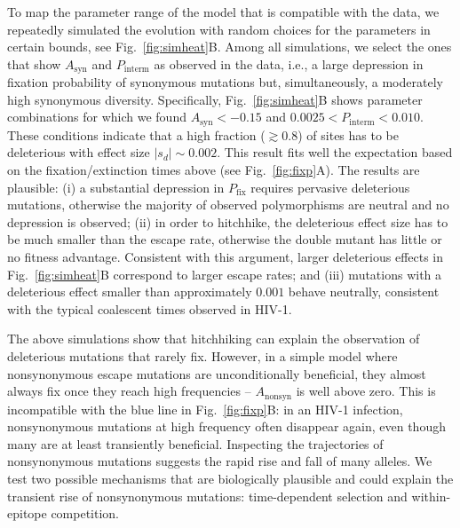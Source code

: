 \documentclass[10pt]{article}
\newcommand{\pfix}{P_{\mathrm{fix}}}
\newcommand{\FIG}[1]{Fig.~\ref{fig:#1}}
\begin{document}
To map the parameter range of the model that is compatible with the data, we
repeatedly simulated the evolution with random choices for the parameters in
certain bounds, see \FIG{simheat}B. Among all simulations, we select the ones
that show $A_\text{syn}$ and $P_\text{interm}$ as observed in the data, i.e., a
large depression in fixation probability of synonymous mutations but,
simultaneously, a moderately high synonymous diversity. Specifically,
\FIG{simheat}B shows parameter combinations for which we found $A_\text{syn} <
-0.15$ and $0.0025 < P_\text{interm} < 0.010$. These conditions indicate that a
high fraction ($\gtrsim 0.8$) of sites has to be deleterious with effect size
$|s_d| \sim 0.002$.  This result fits well the expectation based on the
fixation/extinction times above (see \FIG{fixp}A). The results are plausible:
(i) a substantial depression in $\pfix$ requires pervasive deleterious
mutations, otherwise the majority of observed polymorphisms are neutral and no
depression is observed; (ii) in order to hitchhike, the deleterious effect size
has to be much smaller than the escape rate, otherwise the double mutant has
little or no fitness advantage. Consistent with this argument, larger
deleterious effects in \FIG{simheat}B correspond to larger escape rates; and (iii)
mutations with a deleterious effect smaller than approximately $0.001$ behave
neutrally, consistent with the typical coalescent times observed in HIV-1.

The above simulations show that hitchhiking can explain the observation of
deleterious mutations that rarely fix. However, in a simple model where
nonsynonymous escape mutations are unconditionally beneficial, they almost
always fix once they reach high frequencies -- $A_{\mathrm{nonsyn}}$ is well
above zero. This is incompatible with the blue line in \FIG{fixp}B: in an HIV-1
infection, nonsynonymous mutations at high frequency often disappear again, even
though many are at least transiently beneficial. Inspecting the trajectories of
nonsynonymous mutations suggests the rapid rise and fall of many alleles. We
test two possible mechanisms that are biologically plausible and could explain
the transient rise of nonsynonymous mutations: time-dependent selection and
within-epitope competition.
\end{document}
